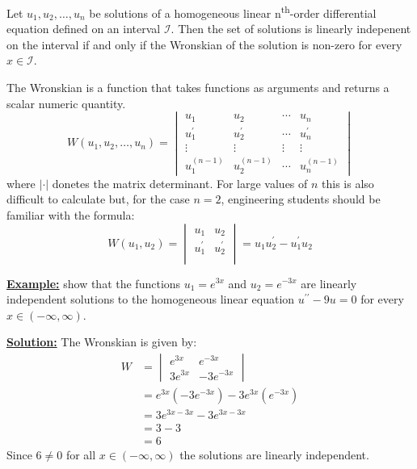 \begin{theorem}
Let $u_1,u_2,\dots,u_n$ be solutions of a homogeneous linear n\textsuperscript{th}-order differential equation defined on an interval $\mathcal{I}$.  Then the set of solutions is linearly indepenent on the interval if and only if the Wronskian of the solution is non-zero for every $x \in \mathcal{I}$.  
\end{theorem}
The Wronskian is a function that takes functions as arguments and returns a scalar numeric quantity.
\begin{equation}
W(u_1,u_2,\dots,u_n)=
\begin{vmatrix}
u_1 & u_2 & \cdots & u_n \\
u^{\prime}_1 & u^{\prime}_2 & \cdots & u^{\prime}_n \\
\vdots & \vdots & \vdots & \vdots \\
u^{(n-1)}_1 & u^{(n-1)}_2 & \cdots & u^{(n-1)}_n
\end{vmatrix}
\label{eq:Wronskian-def}
\end{equation}
where $|\cdot|$ donetes the matrix determinant.  For large values of $n$ this is also difficult to calculate but, for the case $n=2$, engineering students should be familiar with the formula:
\begin{equation}
W(u_1,u_2) = 
\begin{vmatrix}
u_1 & u_2 \\
u^{\prime}_1 & u^{\prime}_2 \\
\end{vmatrix}
= u_1 u^{\prime}_2 - u^{\prime}_1 u_2
\end{equation}

\vspace{0.5cm}

\noindent\textbf{\underline{Example:}} show that the functions $u_1 = e^{3x}$ and $u_2=e^{-3x}$ are linearly independent solutions to the homogeneous linear equation $u^{\prime \prime}-9u=0$ for every $x \in (-\infty,\infty)$.

\noindent\textbf{\underline{Solution:}} The Wronskian is given by:
\begin{align*}
W &= 
\begin{vmatrix}
e^{3x} & e^{-3x} \\
3e^{3x} & -3e^{-3x}
\end{vmatrix} \\
&= e^{3x}\left(-3e^{-3x}\right) - 3e^{3x}\left(e^{-3x}\right) \\
&= 3e^{3x-3x} - 3e^{3x-3x} \\
&= 3 - 3 \\
&= 6
\end{align*}
\noindent Since $6 \ne 0$ for all $x \in (-\infty,\infty)$ the solutions are linearly independent.

